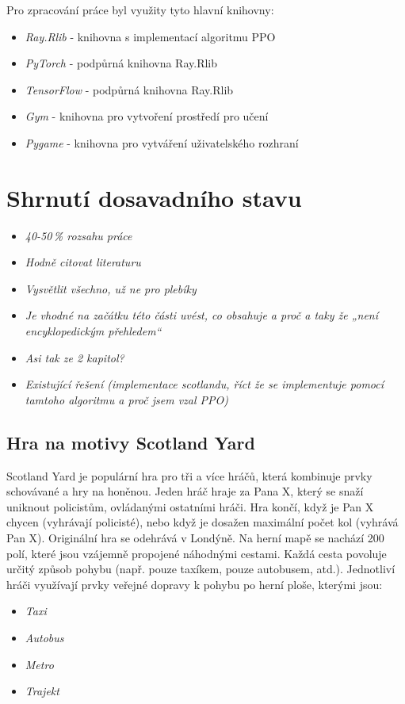 Pro zpracování práce byl využity tyto hlavní knihovny:
\begin{itemize}
  \item \textit{Ray.Rlib} - knihovna s implementací algoritmu PPO
  \item \textit{PyTorch} - podpůrná knihovna Ray.Rlib
  \item \textit{TensorFlow} - podpůrná knihovna Ray.Rlib
  \item \textit{Gym} - knihovna pro vytvoření prostředí pro učení
  \item \textit{Pygame} - knihovna pro vytváření uživatelského rozhraní
\end{itemize}


\chapter{Shrnutí dosavadního stavu}
\label{dosavadni-stav}

\begin{itemize}
  \item \textit {40-50\,\% rozsahu práce}
  \item \textit{Hodně citovat literaturu}
  \item \textit{Vysvětlit všechno, už ne pro plebíky}
  \item \textit{Je vhodné na začátku této části uvést, co obsahuje a proč a taky že „není encyklopedickým přehledem“}
  \item \textit{Asi tak ze 2 kapitol?}
  \item \textit{Existující řešení (implementace scotlandu, říct že se implementuje pomocí tamtoho algoritmu a proč jsem vzal PPO)}
\end{itemize}


\section{Hra na motivy Scotland Yard}

Scotland Yard je populární hra pro tři a více hráčů, která kombinuje prvky schovávané a hry na honěnou.
Jeden hráč hraje za Pana X, který se snaží uniknout policistům, ovládanými ostatními hráči.
Hra končí, když je Pan X chycen (vyhrávají policisté), nebo když je dosažen maximální počet kol (vyhrává Pan X).
Originální hra se odehrává v Londýně.
Na herní mapě se nachází 200 polí, které jsou vzájemně propojené náhodnými cestami.
Každá cesta povoluje určitý způsob pohybu (např. pouze taxíkem, pouze autobusem, atd.).
Jednotliví hráči využívají prvky veřejné dopravy k pohybu po herní ploše, kterými jsou:
\begin{itemize}
  \item \textit{Taxi}
  \item \textit{Autobus}
  \item \textit{Metro}
  \item \textit{Trajekt}
\end{itemize}

